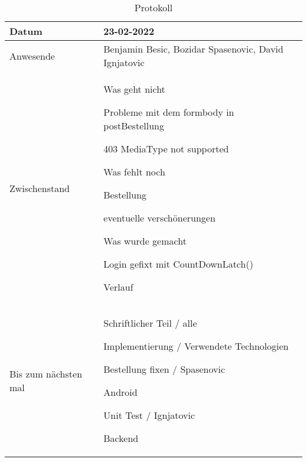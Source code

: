 \begin{table}
    \begin{tabular}{ |p{3cm}|p{10cm}|  }
        \hline
        Datum & 23-02-2022\\
        \hline
        Anwesende & Benjamin Besic, Bozidar Spasenovic, David Ignjatovic\\

        \hline
        Zwischenstand& Was geht nicht

        Probleme mit dem formbody in postBestellung
    
            403 MediaType not supported
    
    Was fehlt noch
    
        Bestellung
    
        eventuelle verschönerungen
    
     Was wurde gemacht
    
        Login gefixt mit CountDownLatch()
    
        Verlauf
    
    \\
        \hline
        Bis zum nächsten mal &  

        Schriftlicher Teil / alle
    
            Implementierung / Verwendete Technologien
    
        Bestellung fixen / Spasenovic
    
            Android
    
        Unit Test / Ignjatovic
    
            Backend
    
    \\
        \hline
    \end{tabular}
    \caption{Protokoll}
    \label{tab:my_label}
\end{table}




